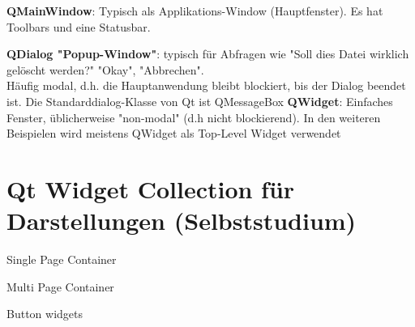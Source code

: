 \textbf{QMainWindow}: Typisch als Applikations-Window (Hauptfenster). Es hat Toolbars und eine Statusbar.

\textbf{QDialog "Popup-Window"}: typisch für Abfragen wie "Soll dies Datei wirklich gelöscht werden?" "Okay", "Abbrechen". \\
Häufig modal, d.h. die Hauptanwendung bleibt blockiert, bis der Dialog beendet ist. Die Standarddialog-Klasse von Qt ist QMessageBox
\textbf{QWidget}: Einfaches Fenster, üblicherweise "non-modal" (d.h nicht blockierend). In den weiteren Beispielen wird meistens QWidget als Top-Level Widget verwendet


\newpage
\section{Qt Widget Collection für Darstellungen (Selbststudium)}


\begin{minipage}{5cm}
	\small{	Single Page Container}
\end{minipage}
\begin{minipage}{5cm}
	\small{Multi Page Container}
\end{minipage}
\begin{minipage}{5cm}
	\small{Button widgets}
\end{minipage}

	\\

